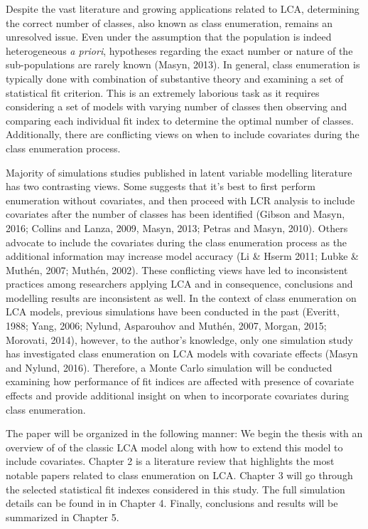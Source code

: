 Despite the vast literature and growing applications related to LCA, determining the correct number of classes, also known as class enumeration, remains an unresolved issue. Even under the assumption that the population is indeed heterogeneous \textit{a priori}, hypotheses regarding the exact number or nature of the sub-populations are rarely known (Masyn, 2013). In general, class enumeration is typically done with combination of substantive theory and examining a set of statistical fit criterion. This is an extremely laborious task as it requires considering a set of models with varying number of classes then observing and comparing each individual fit index to determine the optimal number of classes. Additionally, there are conflicting views on when to include covariates during the class enumeration process. 

Majority of simulations studies published in latent variable modelling literature has two contrasting views. Some suggests that it's best to first perform enumeration without covariates, and then proceed with LCR analysis to include covariates after the number of classes has been identified (Gibson and Masyn, 2016; Collins and Lanza, 2009, Masyn, 2013; Petras and Masyn, 2010). Others advocate to include the covariates during the class enumeration process as the additional information may increase model accuracy (Li & Hserm 2011; Lubke & Muth\'en, 2007; Muth\'en, 2002). These conflicting views have led to inconsistent practices among researchers applying LCA and in consequence, conclusions and modelling results are inconsistent as well. In the context of class enumeration on LCA models, previous simulations have been conducted in the past (Everitt, 1988; Yang, 2006; Nylund, Asparouhov and Muth\'en, 2007, Morgan, 2015; Morovati, 2014), however, to the author's knowledge, only one simulation study has investigated class enumeration on LCA models with covariate effects (Masyn and Nylund, 2016). Therefore, a Monte Carlo simulation will be conducted examining how performance of fit indices are affected with presence of covariate effects and provide additional insight on when to incorporate covariates during class enumeration. 

The paper will be organized in the following manner: We begin the thesis with an overview of of the classic LCA model along with how to extend this model to include covariates. Chapter 2 is a literature review that highlights the most notable papers related to class enumeration on LCA. Chapter 3 will go through the selected statistical fit indexes considered in this study. The full simulation details can be found in in Chapter 4. Finally, conclusions and results will be summarized in Chapter 5. 





